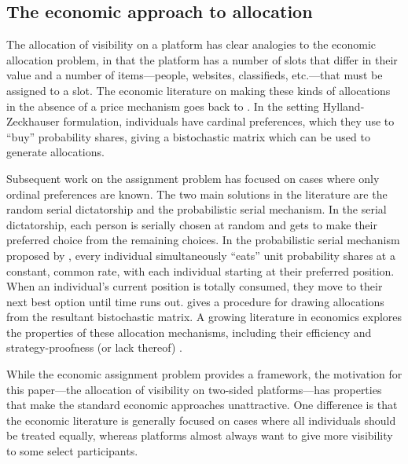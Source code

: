 \documentclass[prodmode,acmec]{acmsmall}
\begin{document}
\subsection{The economic approach to allocation} 
The allocation of visibility on a platform has clear analogies to the
economic allocation problem, in that the platform has a number of
slots that differ in their value and a number of items---people,
websites, classifieds, etc.---that must be assigned to a slot. The
economic literature on making these kinds of allocations in the
absence of a price mechanism goes back to
\cite{hylland1979efficient}. In the setting Hylland-Zeckhauser
formulation, individuals have cardinal preferences, which they use to
``buy'' probability shares, giving a bistochastic matrix which can be
used to generate allocations.

Subsequent work on the assignment problem has focused on cases where
only ordinal preferences are known. The two main solutions in the
literature are the random serial dictatorship and the probabilistic
serial mechanism. In the serial dictatorship, each person is serially
chosen at random and gets to make their preferred choice from the
remaining choices. In the probabilistic serial mechanism proposed by
\cite{bogomolnaia2001new}, every individual simultaneously ``eats''
unit probability shares at a constant, common rate, with each
individual starting at their preferred position. When an individual's
current position is totally consumed, they move to their next best
option until time runs out. \cite{budish2009implementing} gives a
procedure for drawing allocations from the resultant bistochastic
matrix. A growing literature in economics explores the properties of
these allocation mechanisms, including their efficiency and
strategy-proofness (or lack thereof)
\cite{kojima2010incentives,manea2007serial,abdulkadiroglu1999house}.

While the economic assignment problem provides a framework, the
motivation for this paper---the allocation of visibility on two-sided
platforms---has properties that make the standard economic approaches
unattractive. One difference is that the economic literature is
generally focused on cases where all individuals should be treated
equally, whereas platforms almost always want to give more visibility
to some select participants.
\end{document}
